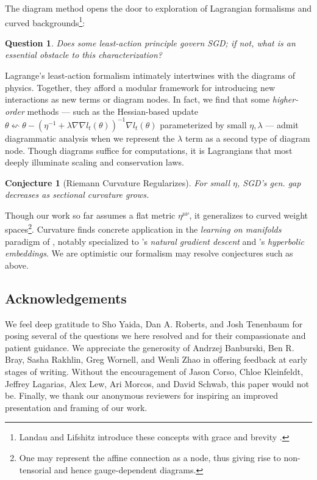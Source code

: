 \documentclass{article}
\theoremstyle{plain}
\newtheorem{conj}{Conjecture}
\newtheorem{quest}{Question}
\theoremstyle{definition}
\begin{document}
        The diagram method opens the door to exploration of Lagrangian
        formalisms and curved backgrounds\footnote{
            Landau and Lifshitz introduce these concepts with grace and brevity
            .
        }:
        \begin{quest}
            Does some least-action principle govern SGD; if not, what is an
            essential obstacle to this characterization?
        \end{quest}
        Lagrange's least-action formalism intimately intertwines with the
        diagrams of physics.  Together, they afford a modular framework for
        introducing new interactions as new terms or diagram nodes.  In fact,
        we find that some \emph{higher-order} methods --- such as the
        Hessian-based update
        $
            \theta \leftsquigarrow
            \theta -
            (\eta^{-1} + \lambda \nabla \nabla l_t(\theta))^{-1}
            \nabla l_t(\theta)
        $
        parameterized by small $\eta, \lambda$ --- admit diagrammatic analysis
        when we represent the $\lambda$ term as a second type of diagram node.
        Though diagrams suffice for computations, it is Lagrangians that most
        deeply illuminate scaling and conservation laws.
        \begin{conj}[Riemann Curvature Regularizes]
            For small $\eta$, SGD's gen. gap decreases as sectional curvature
            grows.
        \end{conj}
        Though our work so far assumes a flat metric $\eta^{\mu\nu}$, it
        generalizes to curved weight spaces\footnote{
            One may represent the affine connection as a node, thus giving
            rise to non-tensorial and hence gauge-dependent diagrams.
        }.
        Curvature finds concrete application in the \emph{learning on
        manifolds} paradigm of \citet{ab07, zh16}, notably specialized to
        \citet{am98}'s \emph{natural gradient descent} and \citet{ni17}'s
        \emph{hyperbolic embeddings}.  We are optimistic our formalism may
        resolve conjectures such as above.


\subsection{Acknowledgements}
    We feel deep gratitude to
        Sho Yaida,
        Dan A. Roberts, and
        Josh Tenenbaum
    for posing several of the questions we here resolved and for their
    compassionate and patient guidance.  We appreciate the generosity of
        Andrzej Banburski,
        Ben R. Bray,
        Sasha Rakhlin,
        Greg Wornell, and
        Wenli Zhao
    in offering feedback at early stages of writing.
    Without the encouragement of
        Jason Corso,
        Chloe Kleinfeldt,
        Jeffrey Lagarias,
        Alex Lew, 
        Ari Morcos, and
        David Schwab,
    this paper would not be.
    Finally, we thank our anonymous reviewers for inspiring an improved
    presentation and framing of our work.
\end{document}
